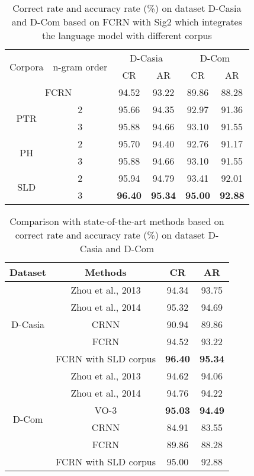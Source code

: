 \documentclass[10pt,conference,a4paper]{IEEEtran}
\begin{document}
\begin{table}[t]
\caption{Correct rate and accuracy rate (\%) on dataset D-Casia and D-Com based on FCRN with Sig2 which integrates the language model with different corpus}
\label{TableCoporaResult}
\centering
\begin{tabular}{cc|cc|cc}
\hline
\multirow{2}{*}{Corpora}&\multirow{2}{*}{n-gram order}&\multicolumn{2}{c|}{D-Casia}&\multicolumn{2}{c}{D-Com}\\
\cline{3-6}
&&CR&AR&CR&AR\\

\hline
\multicolumn{2}{c|}{FCRN}&94.52&93.22&89.86&88.28\\
\hline
\multirow{2}{*}{PTR}&2&95.66&94.35&92.97&91.36\\
&3&95.88&94.66&93.10&91.55\\
\hline
\multirow{2}{*}{PH}&2&95.70&94.40&92.76&91.17\\
&3&95.88&94.66&93.10&91.55\\
\hline
\multirow{2}{*}{SLD}&2&95.94&94.79&93.41&92.01\\
&3&\textbf{96.40}&\textbf{95.34}&\textbf{95.00}&\textbf{92.88}\\

\hline
\end{tabular}
\end{table}


\begin{table}[b]
\caption{Comparison with state-of-the-art methods based on correct rate and accuracy rate (\%) on dataset D-Casia and D-Com}
\label{TableFinalResult}
\centering
\begin{tabular}{c|c|cc}
\hline
Dataset&Methods&CR&AR\\
\hline
\multirow{5}{*}{D-Casia}&Zhou et al., 2013\cite{zhou2013handwritten}&94.34&93.75 \\
&Zhou et al., 2014\cite{zhou2014minimum}&95.32 & 94.69\\
&CRNN\cite{shi2015end}& 90.94& 89.86\\
&FCRN& 94.52& 93.22\\
&FCRN with SLD corpus& \textbf{96.40}&\textbf{95.34} \\
\hline
\multirow{6}{*}{D-Com}&Zhou et al., 2013\cite{zhou2013handwritten}&94.62&94.06\\
&Zhou et al., 2014\cite{zhou2014minimum}&94.76&94.22\\
&VO-3\cite{yin2013icdar}&\textbf{95.03}&\textbf{94.49} \\
&CRNN\cite{shi2015end}& 84.91&83.55\\
&FCRN& 89.86&88.28\\
&FCRN with SLD corpus&95.00&92.88\\
\hline
\end{tabular}
\end{table}
\end{document}
